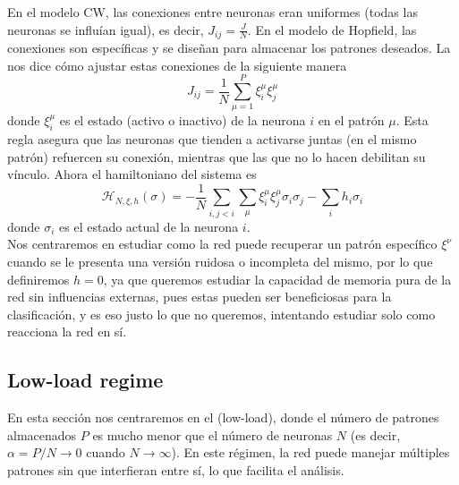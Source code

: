 \noindent
En el modelo CW, las conexiones entre neuronas eran uniformes (todas las neuronas se influían igual), es decir, $J_{ij} = \frac{J}{N}$. En el modelo de Hopfield, las conexiones son específicas y se diseñan para almacenar los patrones deseados. La  nos dice cómo ajustar estas conexiones de la siguiente manera
\begin{equation*}
    J_{ij} = \frac{1}{N} \sum_{\mu=1}^{P} \xi_i^\mu \xi_j^\mu
\end{equation*}
donde $\xi_i^\mu$ es el estado (activo o inactivo) de la neurona $i$ en el patrón $\mu$. Esta regla asegura que las neuronas que tienden a activarse juntas (en el mismo patrón) refuercen su conexión, mientras que las que no lo hacen debilitan su vínculo. Ahora el hamiltoniano del sistema es
\begin{equation*}
    \mathcal{H}_{N,\xi,h}(\sigma) = -\frac{1}{N} \sum_{i,j<i} \sum_\mu \xi_i^\mu \xi_j^\mu \sigma_i \sigma_j - \sum_i h_i \sigma_i 
\end{equation*}
donde $\sigma_i$ es el estado actual de la neurona $i$. \\

\noindent
Nos centraremos en estudiar como la red puede recuperar un patrón específico $\xi^\nu$ cuando se le presenta una versión ruidosa o incompleta del mismo, por lo que definiremos $h=0$, ya que queremos estudiar la capacidad de memoria pura de la red sin influencias externas, pues estas pueden ser beneficiosas para la clasificación, y es eso justo lo que no queremos, intentando estudiar solo como reacciona la red en sí. \\

\subsection{Low-load regime}
\noindent
En esta sección nos centraremos en el  (low-load), donde el número de patrones almacenados $P$ es mucho menor que el número de neuronas $N$ (es decir, $\alpha=P/N \to 0$ cuando $N \to \infty$). En este régimen, la red puede manejar múltiples patrones sin que interfieran entre sí, lo que facilita el análisis. \\


